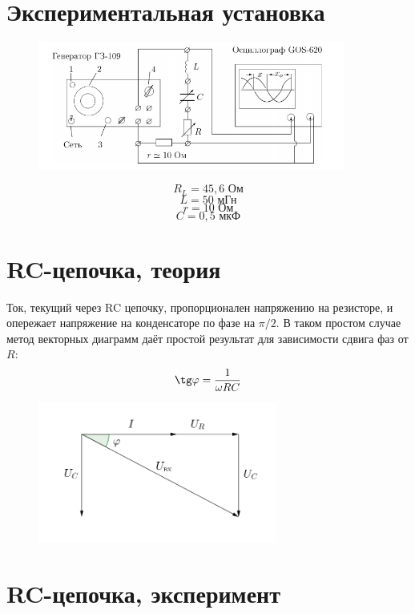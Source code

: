 \documentclass[a4paper, 12pt]{article}
\begin{document}


\section*{Экспериментальная установка}
\begin {figure}[H]
\begin{center}
\includegraphics[width=0.9\textwidth]{t}
\end{center}
\end {figure}
$$R_L=45,6 \text{ Ом}$$
$$L=50 \text{ мГн}$$
$$r=10 \text { Ом}$$
$$C=0,5 \text{ мкФ}$$
\section*{RC-цепочка, теория}
Ток, текущий через RC цепочку, пропорционален напряжению на резисторе, и опережает напряжение на конденсаторе по фазе на $\pi/2$. В таком простом случае метод векторных диаграмм даёт простой результат для зависимости сдвига фаз от $R$:
$$\tg\varphi = \frac{1}{\omega R C}$$
\begin {figure}[H]
\begin{center}
\includegraphics[width=0.7\textwidth]{rcd}
\end{center}
\end {figure}

\section*{RC-цепочка, эксперимент}
\begin {figure}[H]
\begin{center}
\scalebox{.95}{}
\end{center}
\end {figure}
\begin {figure}[H]
\begin{center}
\scalebox{.95}{}
\end{center}
\end {figure}
\end{document}
